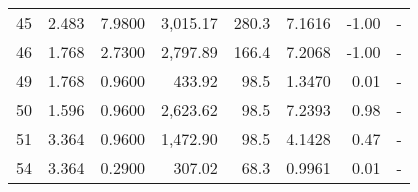 \documentclass[]{article}
\begin{document}
\begin{longtable}[H]{lrrrrrrr}
45    &                                                     2.483 &                                             7.9800 &                   3,015.17 &                                                      280.3 &                      7.1616 &                                                       -1.00 &                                                                                           - \\
46    &                                                     1.768 &                                             2.7300 &                   2,797.89 &                                                      166.4 &                      7.2068 &                                                       -1.00 &                                                                                           - \\
49    &                                                     1.768 &                                             0.9600 &                     433.92 &                                                       98.5 &                      1.3470 &                                                        0.01 &                                                                                           - \\
50    &                                                     1.596 &                                             0.9600 &                   2,623.62 &                                                       98.5 &                      7.2393 &                                                        0.98 &                                                                                           - \\
51    &                                                     3.364 &                                             0.9600 &                   1,472.90 &                                                       98.5 &                      4.1428 &                                                        0.47 &                                                                                           - \\
54    &                                                     3.364 &                                             0.2900 &                     307.02 &                                                       68.3 &                      0.9961 &                                                        0.01 &                                                                                           - \\

\end{longtable}
\end{document}

